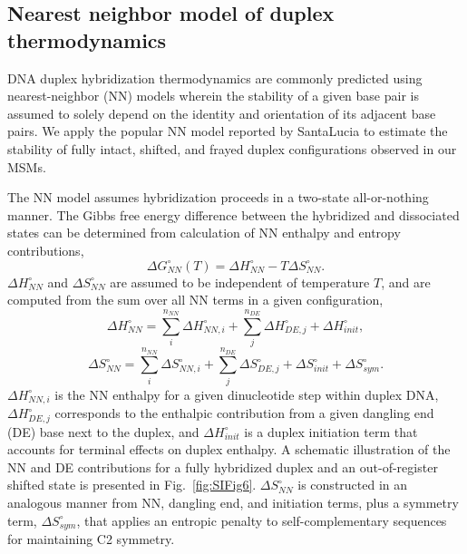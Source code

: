 \documentclass[journal=jpcbfk,manuscript=article]{achemso}
\begin{document}
\clearpage
\newpage

\subsection*{Nearest neighbor model of duplex thermodynamics}

DNA duplex hybridization thermodynamics are commonly predicted using nearest-neighbor (NN) models wherein the stability of a given base pair is assumed to solely depend on the identity and orientation of its adjacent base pairs. We apply the popular NN model reported by SantaLucia\citep{SantaLucia1998AThermodynamics} to estimate the stability of fully intact, shifted, and frayed duplex configurations observed in our MSMs. 

The NN model assumes hybridization proceeds in a two-state all-or-nothing manner. The Gibbs free energy difference between the hybridized and dissociated states can be determined from calculation of NN enthalpy and entropy contributions,
\begin{equation}\label{SIe1}
\Delta G_{NN}^{\circ}(T) = \Delta H_{NN}^{\circ} - T\Delta S_{NN}^{\circ}.
\end{equation}
$\Delta H_{NN}^{\circ}$ and $\Delta S_{NN}^{\circ}$ are assumed to be independent of temperature $T$, and are computed from the sum over all NN terms in a given configuration,
\begin{equation}\label{SIe2}
\Delta H_{NN}^{\circ} = \sum_{i}^{n_{NN}}\Delta H_{NN, i}^{\circ} + \sum_{j}^{n_{DE}}\Delta H_{DE, j}^{\circ} + \Delta H_{init}^{\circ},
\end{equation}
\begin{equation}\label{SIe3}
\Delta S_{NN}^{\circ} = \sum_{i}^{n_{NN}}\Delta S_{NN, i}^{\circ} + \sum_{j}^{n_{DE}}\Delta S_{DE, j}^{\circ} + \Delta S_{init}^{\circ} + \Delta S_{sym}^{\circ}.
\end{equation}                          
$\Delta H_{NN, i}^{\circ}$ is the NN enthalpy for a given dinucleotide step within duplex DNA, $\Delta H_{DE, j}^{\circ}$ corresponds to the enthalpic contribution from a given dangling end (DE) base next to the duplex\citep{Santalucia2004TheMotifs}, and $\Delta H_{init}^{\circ}$ is a duplex initiation term that accounts for terminal effects on duplex enthalpy. A schematic illustration of the NN and DE contributions for a fully hybridized duplex and an out-of-register shifted state is presented in Fig.~\ref{fig:SIFig6}. $\Delta S_{NN}^{\circ}$ is constructed in an analogous manner from NN, dangling end, and initiation terms, plus a symmetry term, $\Delta S_{sym}^{\circ}$, that applies an entropic penalty to self-complementary sequences for maintaining C2 symmetry. 
\end{document}
